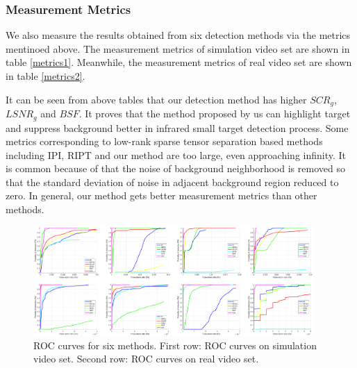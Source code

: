 \documentclass[journal]{IEEEtran}
\begin{document}
\subsubsection{Measurement Metrics}
We also measure the results obtained from six detection methods via the metrics mentinoed above. The measurement metrics of simulation video set are shown in table \ref{metrics1}. Meanwhile, the measurement metrics of real video set are shown in table \ref{metrics2}.

It can be seen from above tables that our detection method has higher $SCR_g$, $LSNR_g$ and $BSF$. It proves that the method proposed by us can highlight target and suppress background better in infrared small target detection process. Some metrics corresponding to low-rank sparse tensor separation based methods including IPI, RIPT and our method are too large, even approaching infinity. It is common because of that the noise of background neighborhood is removed so that the standard deviation of noise in adjacent background region reduced to zero. In general, our method gets better measurement metrics than other methods.

\begin{figure}[htb]
  \centering
  \includegraphics[width=0.95\textwidth]{ROC.eps}
  \caption{ROC curves for six methods. First row: ROC curves on simulation video set. Second row: ROC curves on real video set.}
  \label{ROC}
\end{figure}
\end{document}
